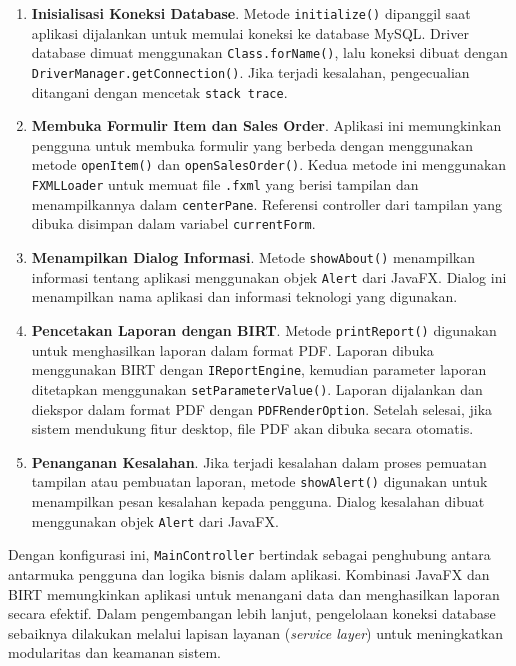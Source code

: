 \begin{enumerate}
\item \textbf{Inisialisasi Koneksi Database}.
Metode \texttt{initialize()} dipanggil saat aplikasi dijalankan untuk memulai koneksi ke database MySQL. Driver database dimuat menggunakan \texttt{Class.forName()}, lalu koneksi dibuat dengan \texttt{DriverManager.getConnection()}. Jika terjadi kesalahan, pengecualian ditangani dengan mencetak \texttt{stack trace}.

\item \textbf{Membuka Formulir Item dan Sales Order}.
Aplikasi ini memungkinkan pengguna untuk membuka formulir yang berbeda dengan menggunakan metode \texttt{openItem()} dan \texttt{openSalesOrder()}. Kedua metode ini menggunakan \texttt{FXMLLoader} untuk memuat file \texttt{.fxml} yang berisi tampilan dan menampilkannya dalam \texttt{centerPane}. Referensi controller dari tampilan yang dibuka disimpan dalam variabel \texttt{currentForm}.

\item \textbf{Menampilkan Dialog Informasi}.
Metode \texttt{showAbout()} menampilkan informasi tentang aplikasi menggunakan objek \texttt{Alert} dari JavaFX. Dialog ini menampilkan nama aplikasi dan informasi teknologi yang digunakan.

\item \textbf{Pencetakan Laporan dengan BIRT}.
Metode \texttt{printReport()} digunakan untuk menghasilkan laporan dalam format PDF. Laporan dibuka menggunakan BIRT dengan \texttt{IReportEngine}, kemudian parameter laporan ditetapkan menggunakan \texttt{setParameterValue()}. Laporan dijalankan dan diekspor dalam format PDF dengan \texttt{PDFRenderOption}. Setelah selesai, jika sistem mendukung fitur desktop, file PDF akan dibuka secara otomatis.

\item \textbf{Penanganan Kesalahan}.
Jika terjadi kesalahan dalam proses pemuatan tampilan atau pembuatan laporan, metode \texttt{showAlert()} digunakan untuk menampilkan pesan kesalahan kepada pengguna. Dialog kesalahan dibuat menggunakan objek \texttt{Alert} dari JavaFX.
\end{enumerate}

Dengan konfigurasi ini, \texttt{MainController} bertindak sebagai penghubung antara antarmuka pengguna dan logika bisnis dalam aplikasi. Kombinasi JavaFX dan BIRT memungkinkan aplikasi untuk menangani data dan menghasilkan laporan secara efektif. Dalam pengembangan lebih lanjut, pengelolaan koneksi database sebaiknya dilakukan melalui lapisan layanan (\textit{service layer}) untuk meningkatkan modularitas dan keamanan sistem.
